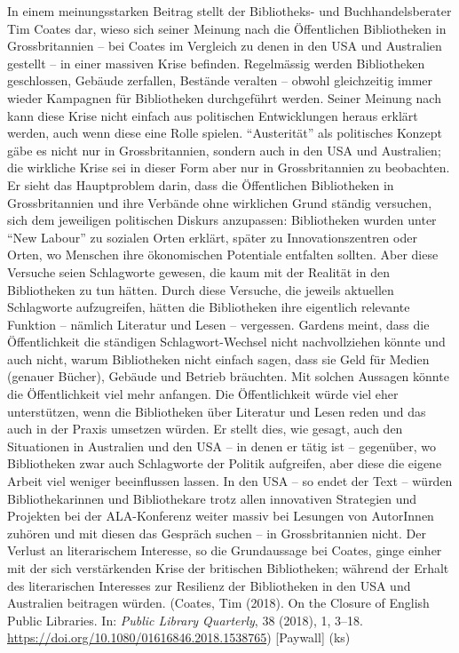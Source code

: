 \documentclass[a4paper,
fontsize=11pt,
oneside,
numbers=noperiodatend,
parskip=half-,
bibliography=totoc,
final
]{scrartcl}
\begin{document}
In einem meinungsstarken Beitrag stellt der Bibliotheks- und
Buchhandelsberater Tim Coates dar, wieso sich seiner Meinung nach die
Öffentlichen Bibliotheken in Grossbritannien -- bei Coates im Vergleich
zu denen in den USA und Australien gestellt -- in einer massiven Krise
befinden. Regelmässig werden Bibliotheken geschlossen, Gebäude
zerfallen, Bestände veralten -- obwohl gleichzeitig immer wieder
Kampagnen für Bibliotheken durchgeführt werden. Seiner Meinung nach kann
diese Krise nicht einfach aus politischen Entwicklungen heraus erklärt
werden, auch wenn diese eine Rolle spielen. \enquote{Austerität} als
politisches Konzept gäbe es nicht nur in Grossbritannien, sondern auch
in den USA und Australien; die wirkliche Krise sei in dieser Form aber
nur in Grossbritannien zu beobachten. Er sieht das Hauptproblem darin,
dass die Öffentlichen Bibliotheken in Grossbritannien und ihre Verbände
ohne wirklichen Grund ständig versuchen, sich dem jeweiligen politischen
Diskurs anzupassen: Bibliotheken wurden unter \enquote{New Labour} zu
sozialen Orten erklärt, später zu Innovationszentren oder Orten, wo
Menschen ihre ökonomischen Potentiale entfalten sollten. Aber diese
Versuche seien Schlagworte gewesen, die kaum mit der Realität in den
Bibliotheken zu tun hätten. Durch diese Versuche, die jeweils aktuellen
Schlagworte aufzugreifen, hätten die Bibliotheken ihre eigentlich
relevante Funktion -- nämlich Literatur und Lesen -- vergessen. Gardens
meint, dass die Öffentlichkeit die ständigen Schlagwort-Wechsel nicht
nachvollziehen könnte und auch nicht, warum Bibliotheken nicht einfach
sagen, dass sie Geld für Medien (genauer Bücher), Gebäude und Betrieb
bräuchten. Mit solchen Aussagen könnte die Öffentlichkeit viel mehr
anfangen. Die Öffentlichkeit würde viel eher unterstützen, wenn die
Bibliotheken über Literatur und Lesen reden und das auch in der Praxis
umsetzen würden. Er stellt dies, wie gesagt, auch den Situationen in
Australien und den USA -- in denen er tätig ist -- gegenüber, wo
Bibliotheken zwar auch Schlagworte der Politik aufgreifen, aber diese
die eigene Arbeit viel weniger beeinflussen lassen. In den USA -- so
endet der Text -- würden Bibliothekarinnen und Bibliothekare trotz allen
innovativen Strategien und Projekten bei der ALA-Konferenz weiter massiv
bei Lesungen von AutorInnen zuhören und mit diesen das Gespräch suchen
-- in Grossbritannien nicht. Der Verlust an literarischem Interesse, so
die Grundaussage bei Coates, ginge einher mit der sich verstärkenden
Krise der britischen Bibliotheken; während der Erhalt des literarischen
Interesses zur Resilienz der Bibliotheken in den USA und Australien
beitragen würden. (Coates, Tim (2018). On the Closure of English Public
Libraries. In: \emph{Public Library Quarterly}, 38 (2018), 1, 3--18.
\url{https://doi.org/10.1080/01616846.2018.1538765}) {[}Paywall{]} (ks)
\end{document}
